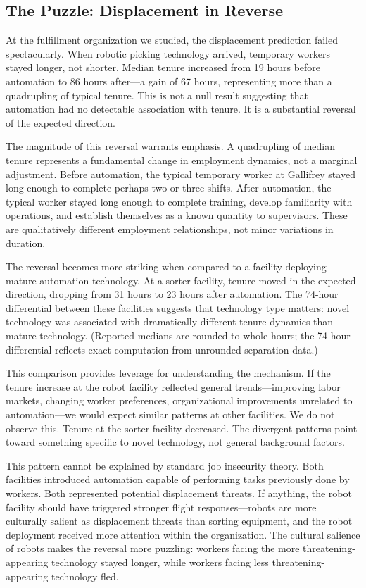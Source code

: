 \documentclass[12pt]{article}
\begin{document}
\subsection{The Puzzle: Displacement in Reverse}

At the fulfillment organization we studied, the displacement prediction failed spectacularly. When robotic picking technology arrived, temporary workers stayed longer, not shorter. Median tenure increased from 19 hours before automation to 86 hours after---a gain of 67 hours, representing more than a quadrupling of typical tenure. This is not a null result suggesting that automation had no detectable association with tenure. It is a substantial reversal of the expected direction.

The magnitude of this reversal warrants emphasis. A quadrupling of median tenure represents a fundamental change in employment dynamics, not a marginal adjustment. Before automation, the typical temporary worker at Gallifrey stayed long enough to complete perhaps two or three shifts. After automation, the typical worker stayed long enough to complete training, develop familiarity with operations, and establish themselves as a known quantity to supervisors. These are qualitatively different employment relationships, not minor variations in duration.

The reversal becomes more striking when compared to a facility deploying mature automation technology. At a sorter facility, tenure moved in the expected direction, dropping from 31 hours to 23 hours after automation. The 74-hour differential between these facilities suggests that technology type matters: novel technology was associated with dramatically different tenure dynamics than mature technology. (Reported medians are rounded to whole hours; the 74-hour differential reflects exact computation from unrounded separation data.)

This comparison provides leverage for understanding the mechanism. If the tenure increase at the robot facility reflected general trends---improving labor markets, changing worker preferences, organizational improvements unrelated to automation---we would expect similar patterns at other facilities. We do not observe this. Tenure at the sorter facility decreased. The divergent patterns point toward something specific to novel technology, not general background factors.

This pattern cannot be explained by standard job insecurity theory. Both facilities introduced automation capable of performing tasks previously done by workers. Both represented potential displacement threats. If anything, the robot facility should have triggered stronger flight responses---robots are more culturally salient as displacement threats than sorting equipment, and the robot deployment received more attention within the organization. The cultural salience of robots makes the reversal more puzzling: workers facing the more threatening-appearing technology stayed longer, while workers facing less threatening-appearing technology fled.
\end{document}
